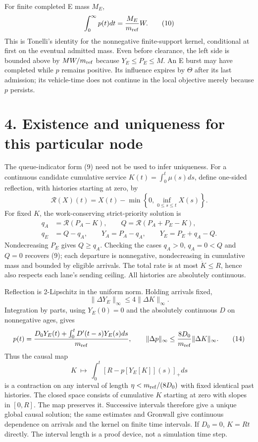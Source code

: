 \documentclass[11pt,a4paper]{article}
\newcommand{\pos}[1]{\left[#1\right]_+}
\newcommand{\Reflect}{\mathcal R}
\begin{document}
For finite completed E mass $M_E$,
\begin{equation}
 \int_0^\infty p(t)dt=\frac{M_E}{m_{\rm ref}}W.
 \tag{10}
\end{equation}
This is Tonelli's identity for the nonnegative finite-support kernel,
conditional at first on the eventual admitted mass. Even before clearance,
the left side is bounded above by $MW/m_{\rm ref}$ because $Y_E\leq P_E\leq M$.
An E burst may have completed while $p$ remains positive. Its influence
expires by $\Theta$ after its last admission; its vehicle-time does not
continue in the local objective merely because $p$ persists.

\newpage
\section*{4. Existence and uniqueness for this particular node}

The queue-indicator form (9) need not be used to infer uniqueness.
For a continuous candidate cumulative service $K(t)=\int_0^t\mu(s)ds$,
define one-sided reflection, with histories starting at zero, by
\begin{equation}
 \Reflect(X)(t)=X(t)-\min\left\{0,\inf_{0\leq s\leq t}X(s)\right\}.
 \tag{11}
\end{equation}
For fixed $K$, the work-conserving strict-priority solution is
\begin{align}
 q_A&=\Reflect(P_A-K),\qquad Q=\Reflect(P_A+P_E-K),\nonumber\\
 q_E&=Q-q_A,\qquad
 Y_A=P_A-q_A,\qquad Y_E=P_E+q_A-Q.
 \tag{12}
\end{align}
Nondecreasing $P_E$ gives $Q\geq q_A$. Checking the cases $q_A>0$,
$q_A=0<Q$ and $Q=0$ recovers (9); each departure is nonnegative,
nondecreasing in cumulative mass and bounded by eligible arrivals.
The total rate is at most $\dot K\leq R$, hence also respects each
lane's sending ceiling. All histories are absolutely continuous.

Reflection is 2-Lipschitz in the uniform norm. Holding arrivals fixed,
\begin{equation}
 \|\Delta Y_E\|_\infty\leq4\|\Delta K\|_\infty.
 \tag{13}
\end{equation}
Integration by parts, using $Y_E(0)=0$ and the absolutely continuous $D$
on nonnegative ages, gives
\begin{equation}
 p(t)=\frac{D_0Y_E(t)+\int_0^tD'(t-s)Y_E(s)ds}{m_{\rm ref}},\qquad
 \|\Delta p\|_\infty\leq\frac{8D_0}{m_{\rm ref}}\|\Delta K\|_\infty.
 \tag{14}
\end{equation}
Thus the causal map
\begin{equation}
 K\ \longmapsto\ \int_0^t\pos{R-p[Y_E[K]](s)}ds
 \tag{15}
\end{equation}
is a contraction on any interval of length
$\eta<m_{\rm ref}/(8D_0)$ with fixed identical past histories. The closed
space consists of cumulative $K$ starting at zero with slopes in $[0,R]$.
The map preserves it. Successive intervals therefore give a unique global
causal solution; the same estimates and Gronwall give continuous dependence
on arrivals and the kernel on finite time intervals. If $D_0=0$, $K=Rt$
directly. The interval length is a proof device, not a simulation time step.
\end{document}
